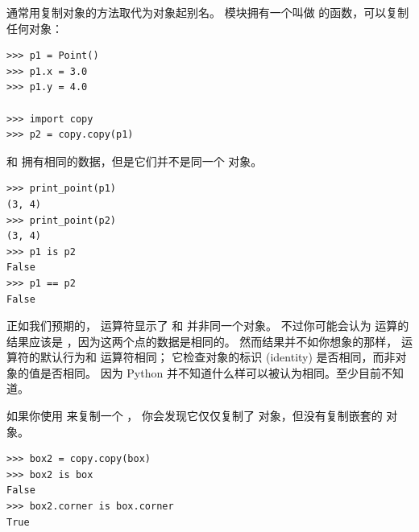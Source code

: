 通常用复制对象的方法取代为对象起别名。
 模块拥有一个叫做  的函数，可以复制任何对象：

\begin{lstlisting}
>>> p1 = Point()
>>> p1.x = 3.0
>>> p1.y = 4.0

>>> import copy
>>> p2 = copy.copy(p1)
\end{lstlisting}


 和  拥有相同的数据，但是它们并不是同一个  对象。

\begin{lstlisting}
>>> print_point(p1)
(3, 4)
>>> print_point(p2)
(3, 4)
>>> p1 is p2
False
>>> p1 == p2
False
\end{lstlisting}


正如我们预期的，  运算符显示了  和  并非同一个对象。
不过你可能会认为 \li{==} 运算的结果应该是  ，因为这两个点的数据是相同的。
然而结果并不如你想象的那样， \li{==} 运算符的默认行为和  运算符相同；
它检查对象的标识 (identity) 是否相同，而非对象的值是否相同。  因为 Python 并不知道什么样可以被认为相同。至少目前不知道。
  
  


如果你使用  来复制一个  ，
你会发现它仅仅复制了  对象，但没有复制嵌套的  对象。

\begin{lstlisting}
>>> box2 = copy.copy(box)
>>> box2 is box
False
>>> box2.corner is box.corner
True
\end{lstlisting}

